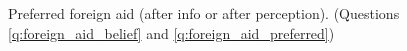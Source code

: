 
\begin{figure} 
    \caption[Preferred foreign aid (summary)]{Preferred foreign aid (after info or after perception). (Questions \ref{q:foreign_aid_belief} and \ref{q:foreign_aid_preferred})}\label{fig:foreign_aid_no_less_all}
\end{figure} 


